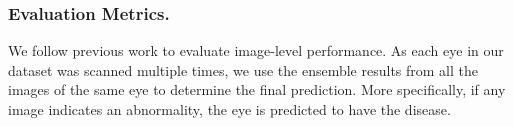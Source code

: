 \documentclass[runningheads]{llncs}
\newcommand{\wdai}[1]{{\color[rgb]{0.9,0.1,0.1}{#1}}}
\newcommand{\wdaicmnt}[1]{{\color[rgb]{0.9,0.1,0.1}{(WD:#1)}}}
\newcommand{\lhwang}[1]{{\color{blue}{[#1]}}}
\newcommand{\xmli}[1]{{\color{red}{[XM: #1]}}}
\begin{document}
\subsubsection{Evaluation Metrics.} 
We follow previous work \cite{li2021multi} to evaluate image-level performance. As each eye in our dataset was scanned multiple times, we use the ensemble results from all the images of the same eye to determine the final prediction. More specifically, if any image indicates an abnormality, the eye is predicted to have the disease.








\end{document}
